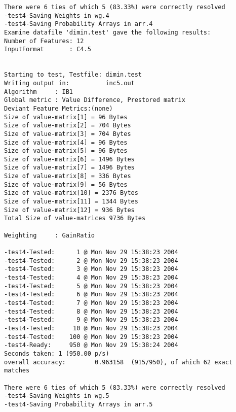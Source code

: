 \begin{footnotesize}
\begin{verbatim}
There were 6 ties of which 5 (83.33%) were correctly resolved
-test4-Saving Weights in wg.4
-test4-Saving Probability Arrays in arr.4
Examine datafile 'dimin.test' gave the following results:
Number of Features: 12
InputFormat       : C4.5


Starting to test, Testfile: dimin.test
Writing output in:          inc5.out
Algorithm     : IB1
Global metric : Value Difference, Prestored matrix
Deviant Feature Metrics:(none)
Size of value-matrix[1] = 96 Bytes 
Size of value-matrix[2] = 704 Bytes 
Size of value-matrix[3] = 704 Bytes 
Size of value-matrix[4] = 96 Bytes 
Size of value-matrix[5] = 96 Bytes 
Size of value-matrix[6] = 1496 Bytes 
Size of value-matrix[7] = 1496 Bytes 
Size of value-matrix[8] = 336 Bytes 
Size of value-matrix[9] = 56 Bytes 
Size of value-matrix[10] = 2376 Bytes 
Size of value-matrix[11] = 1344 Bytes 
Size of value-matrix[12] = 936 Bytes 
Total Size of value-matrices 9736 Bytes 

Weighting     : GainRatio

-test4-Tested:      1 @ Mon Nov 29 15:38:23 2004
-test4-Tested:      2 @ Mon Nov 29 15:38:23 2004
-test4-Tested:      3 @ Mon Nov 29 15:38:23 2004
-test4-Tested:      4 @ Mon Nov 29 15:38:23 2004
-test4-Tested:      5 @ Mon Nov 29 15:38:23 2004
-test4-Tested:      6 @ Mon Nov 29 15:38:23 2004
-test4-Tested:      7 @ Mon Nov 29 15:38:23 2004
-test4-Tested:      8 @ Mon Nov 29 15:38:23 2004
-test4-Tested:      9 @ Mon Nov 29 15:38:23 2004
-test4-Tested:     10 @ Mon Nov 29 15:38:23 2004
-test4-Tested:    100 @ Mon Nov 29 15:38:23 2004
-test4-Ready:     950 @ Mon Nov 29 15:38:24 2004
Seconds taken: 1 (950.00 p/s)
overall accuracy:        0.963158  (915/950), of which 62 exact matches 

There were 6 ties of which 5 (83.33%) were correctly resolved
-test4-Saving Weights in wg.5
-test4-Saving Probability Arrays in arr.5
\end{verbatim}
\end{footnotesize}



